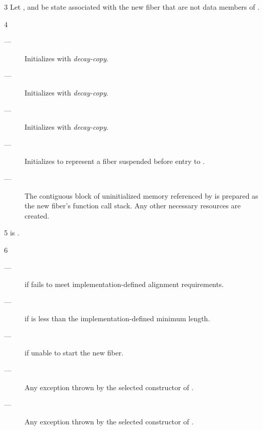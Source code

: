 3 Let , 
and  be state associated with the new fiber
that are not data members of \fiber. 

4 \effects
\begin{description}
    \item[---] Initializes  with \emph{decay-copy}.
    \item[---] Initializes  with \emph{decay-copy}.
    \item[---] Initializes  with \emph{decay-copy}.
    \item[---] Initializes  to represent a fiber suspended before
              entry to .
    \item[---] The contiguous block of uninitialized memory referenced
              by  is prepared as the new fiber's function call stack.
              Any other necessary resources are created.
\end{description}

5 \postcond
\emptyfn is \false.

6 \except
\begin{description}
    \item[---]  if  fails to meet
               implementation-defined alignment requirements.
    \item[---]  if  is less than the
               implementation-defined minimum length.
    \item[---]  if unable to start the new fiber.
    \item[---] Any exception thrown by the selected constructor of .
    \item[---] Any exception thrown by the selected constructor of .
\end{description}

